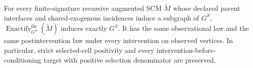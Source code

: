 For every finite-signature recursive augmented SCM \(\widetilde M\) whose declared parent interfaces and shared-exogenous incidences induce a subgraph of \(G^S\), \(\operatorname{Exactify}^{\mathrm{fin}}_{G^S}(\widetilde M)\) induces exactly \(G^S\). It has the same observational law and the same postintervention law under every intervention on observed vertices. In particular, strict selected-cell positivity and every intervention-before-conditioning target with positive selection denominator are preserved.